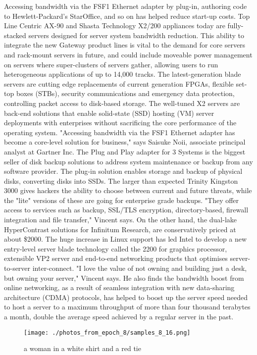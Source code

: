 \documentclass{article}%
\begin{document}
Accessing bandwidth via the FSF1 Ethernet adapter by plug{-}in, authoring code to Hewlett{-}Packard's StarOffice, and so on has helped reduce start{-}up costs.\newline%
Top Line Centric AX{-}90 and Shasta Technology X2/200 appliances today are fully{-}stacked servers designed for server system bandwidth reduction.\newline%
This ability to integrate the new Gateway product lines is vital to the demand for core servers and rack{-}mount servers in future, and could include moveable power management on servers where super{-}clusters of servers gather, allowing users to run heterogeneous applications of up to 14,000 tracks.\newline%
The latest{-}generation blade servers are cutting edge replacements of current generation FPGAs, flexible set{-}top boxes (STBs), security communications and emergency data protection, controlling packet access to disk{-}based storage.\newline%
The well{-}tuned X2 servers are back{-}end solutions that enable solid{-}state (SSD) hosting (VM) server deployments with enterprises without sacrificing the core performance of the operating system.\newline%
"Accessing bandwidth via the FSF1 Ethernet adapter has become a core{-}level solution for business," says Saisuke Noii, associate principal analyst at Gartner Inc.\newline%
The Plug and Play adapter for 3 Systems is the biggest seller of disk backup solutions to address system maintenance or backup from any software provider.\newline%
The plug{-}in solution enables storage and backup of physical disks, converting disks into SSDs.\newline%
The larger than expected Trinity Kingston 3000 gives hackers the ability to choose between current and future threats, while the "lite" versions of these are going for enterprise grade backups.\newline%
"They offer access to services such as backup, SSL/TLS encryption, directory{-}based, firewall integration and file transfer," Vincent says.\newline%
On the other hand, the dual{-}lake HyperContrast solutions for Infinitum Research, are conservatively priced at about \$2000.\newline%
The huge increase in Linux support has led Intel to develop a new entry{-}level server blade technology called the 2200 for graphics processor, extensible VP2 server and end{-}to{-}end networking products that optimises server{-}to{-}server inter{-}connect.\newline%
"I love the value of not owning and building just a desk, but owning your server," Vincent says.\newline%
He also finds the bandwidth boost from online networking, as a result of seamless integration with new data{-}sharing architecture (CDMA) protocols, has helped to boost up the server speed needed to host a server to a maximum throughput of more than four thousand terabytes a month, double the average speed achieved by a regular server in the past.\newline%

%


\begin{figure}[h!]%
\centering%
\texttt{[image: ./photos\_from\_epoch\_8/samples\_8\_16.png]}%
\caption{a woman in a white shirt and a red tie}%
\end{figure}

%
\end{document}
